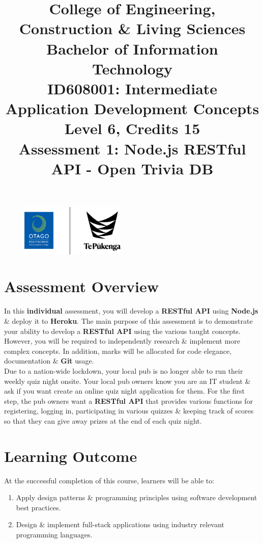 \documentclass{article}
\author{}
\begin{document}
\begin{figure}
	\centering
	\includegraphics[width=50mm]{../../resources/img/logo.png}
\end{figure}

\title{College of Engineering, Construction \& Living Sciences\\Bachelor of Information Technology\\ID608001: Intermediate Application Development Concepts\\Level 6, Credits 15\\\textbf{Assessment 1: Node.js RESTful API - Open Trivia DB}}
\date{}
\maketitle

\section*{Assessment Overview}
In this \textbf{individual} assessment, you will develop a \textbf{RESTful API} using \textbf{Node.js} \& deploy it to \textbf{Heroku}. The main purpose of this assessment is to demonstrate your ability to develop a \textbf{RESTful API} using the various taught concepts. However, you will be required to independently research \& implement more complex concepts. In addition, marks will be allocated for code elegance, documentation \& \textbf{Git} usage.\\

Due to a nation-wide lockdown, your local pub is no longer able to run their weekly quiz night onsite. Your local pub owners know you are an IT student \& ask if you want create an online quiz night application for them. For the first step, the pub owners want a \textbf{RESTful API} that provides various functions for registering, logging in, participating in various quizzes \& keeping track of scores so that they can give away prizes at the end of each quiz night.

\section*{Learning Outcome}
At the successful completion of this course, learners will be able to:
\begin{enumerate}
	\item Apply design patterns \& programming principles using software development best practices.
	\item Design \& implement full-stack applications using industry relevant programming languages.
\end{enumerate}
\end{document}
